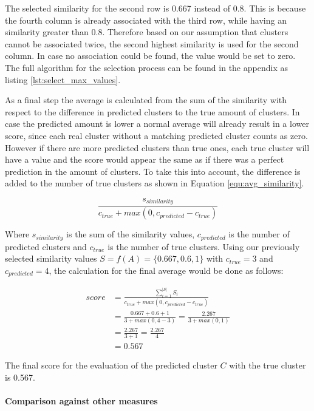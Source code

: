 The selected similarity for the second row is 0.667 instead of 0.8. This is because the fourth column is already associated with the third row, while having an similarity greater than 0.8. Therefore based on our assumption that clusters cannot be associated twice, the second highest similarity is used for the second column. In case no association could be found, the value would be set to zero. The full algorithm for the selection process can be found in the appendix as listing \ref{lst:select_max_values}.

As a final step the average is calculated from the sum of the similarity with respect to the difference in predicted clusters to the true amount of clusters. In case the predicted amount is lower a normal average will already result in a lower score, since each real cluster without a matching predicted cluster counts as zero. However if there are more predicted clusters than true ones, each true cluster will have a value and the score would appear the same as if there was a perfect prediction in the amount of clusters. To take this into account, the difference is added to the number of true clusters as shown in Equation \ref{equ:avg_similarity}.

\begin{equation}
    \label{equ:avg_similarity}
        \frac{s_{similarity}}{c_{true} + max(0, c_{predicted} - c_{true})}
\end{equation}

Where $s_{similarity}$ is the sum of the similarity values, $c_{predicted}$ is the number of predicted clusters and $c_{true}$ is the number of true clusters. Using our previously selected similarity values $S = f(A) = \{0.667, 0.6, 1\}$ with  $c_{true}=3$ and $c_{predicted}=4$, the calculation for the final average would be done as follows:

\begin{align*}
    score &= \frac{\sum_{i=1}^{|S|} S_i}{c_{true} + max(0, c_{predicted} - c_{true})} \\
    &= \frac{0.667 + 0.6 + 1}{3 + max(0, 4 - 3)} = \frac{2.267}{3 + max(0, 1)} \\
    &= \frac{2.267}{3 + 1} = \frac{2.267}{4} \\
    &= \mathbf{0.567}
\end{align*}

The final score for the evaluation of the predicted cluster $C$ with the true cluster is 0.567.

\paragraph{Comparison against other measures}

